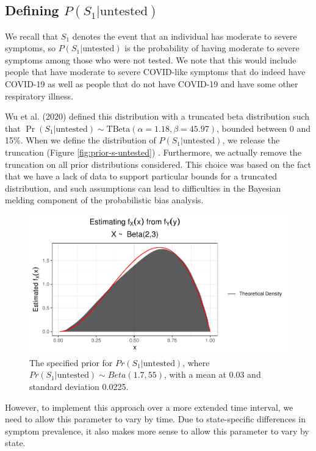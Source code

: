 \documentclass[12pt,twoside]{smiththesis}
\begin{document}
\hypertarget{defining-ps_1textuntested}{%
\subsection{\texorpdfstring{Defining \(P(S_1|\text{untested})\)}{Defining P(S\_1\textbar\textbackslash text\{untested\})}}\label{defining-ps_1textuntested}}

We recall that \(S_1\) denotes the event that an individual has moderate to severe symptoms, so
\(P(S_1|\text{untested})\) is the probability of having moderate to severe symptoms among those who were not tested. We note that this would include people that have moderate to severe COVID-like symptoms that do indeed have COVID-19 as well as people that do not have COVID-19 and have some other respiratory illness.

Wu et al. (2020) defined this distribution with a truncated beta distribution such that \(\Pr(S_1|\text{untested}) \sim \text{TBeta}(\alpha = 1.18, \beta = 45.97)\), bounded between 0 and 15\%. When we define the distribution of \(P(S_1|\text{untested})\), we release the truncation (Figure \ref{fig:prior-s-untested}) . Furthermore, we actually remove the truncation on all prior distributions considered. This choice was based on the fact that we have a lack of data to support particular bounds for a truncated distribution, and such assumptions can lead to difficulties in the Bayesian melding component of the probabilistic bias analysis.
\begin{figure}

{\centering \includegraphics[width=0.8\linewidth]{thesis_files/figure-latex/unnamed-chunk-41-1} 

}

\caption{\label{fig:prior-s-untested}The specified prior for $Pr(S_1|\text{untested})$, where  $Pr(S_1|\text{untested}) \sim Beta(1.7,55)$, with a mean at 0.03 and standard deviation 0.0225.}\label{fig:unnamed-chunk-41}
\end{figure}
However, to implement this approach over a more extended time interval, we need to allow this parameter to vary by time. Due to state-specific differences in symptom prevalence, it also makes more sense to allow this parameter to vary by state.
\end{document}
